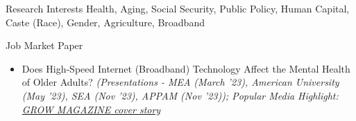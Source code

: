 \documentclass{resume} %
\begin{document}

\begin{rSection}{Research Interests}
Health, Aging, Social Security, Public Policy, Human Capital, Caste (Race), Gender, Agriculture, Broadband
\end{rSection}


\begin{rSection}{Job Market Paper}
\begin{itemize}
\item Does High-Speed Internet (Broadband) Technology Affect the Mental Health of Older Adults? \textit{\scriptsize{(Presentations - MEA (March '23), American University (May '23), SEA (Nov '23), APPAM (Nov '23)); Popular Media Highlight: \href{https://grow.cals.wisc.edu/departments/features/the-road-to-rural-broadband}{GROW MAGAZINE cover story}}} 
\end{itemize}


\end{rSection}
\end{document}

